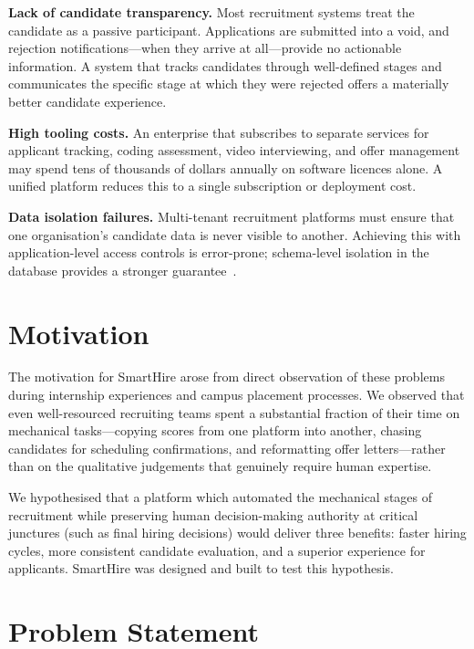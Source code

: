 \textbf{Lack of candidate transparency.} Most recruitment systems treat the candidate as a passive participant. Applications are submitted into a void, and rejection notifications---when they arrive at all---provide no actionable information. A system that tracks candidates through well-defined stages and communicates the specific stage at which they were rejected offers a materially better candidate experience.

\textbf{High tooling costs.} An enterprise that subscribes to separate services for applicant tracking, coding assessment, video interviewing, and offer management may spend tens of thousands of dollars annually on software licences alone. A unified platform reduces this to a single subscription or deployment cost.

\textbf{Data isolation failures.} Multi-tenant recruitment platforms must ensure that one organisation's candidate data is never visible to another. Achieving this with application-level access controls is error-prone; schema-level isolation in the database provides a stronger guarantee~\cite{postgresql2024}.

\section{Motivation}
\label{sec:motivation}

The motivation for SmartHire arose from direct observation of these problems during internship experiences and campus placement processes. We observed that even well-resourced recruiting teams spent a substantial fraction of their time on mechanical tasks---copying scores from one platform into another, chasing candidates for scheduling confirmations, and reformatting offer letters---rather than on the qualitative judgements that genuinely require human expertise.

We hypothesised that a platform which automated the mechanical stages of recruitment while preserving human decision-making authority at critical junctures (such as final hiring decisions) would deliver three benefits: faster hiring cycles, more consistent candidate evaluation, and a superior experience for applicants. SmartHire was designed and built to test this hypothesis.

\section{Problem Statement}
\label{sec:problem-statement}

